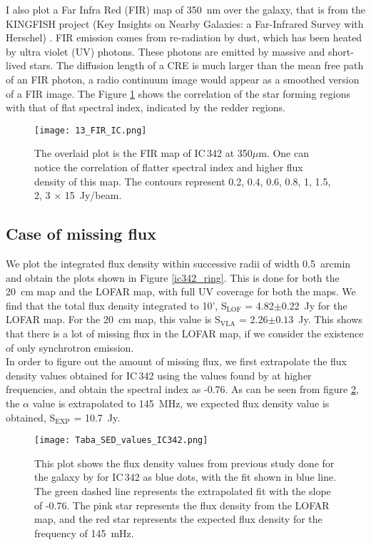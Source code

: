 \documentclass[../main/thesis_msc.tex]{subfiles}
\begin{document}
I also plot a Far Infra Red (FIR) map of 350~nm over the galaxy, that is from the KINGFISH project (Key Insights on Nearby Galaxies: a Far-Infrared Survey with Herschel) \citep{2011PASP..123.1347K}. FIR emission comes from re-radiation by dust, which has been heated by ultra violet (UV) photons. These photons are emitted by massive and short-lived stars. The diffusion length of a CRE is much larger than the mean free path of an FIR photon, a radio continuum image would appear as a smoothed version of a FIR image. The Figure \ref{FIRic} shows the correlation of the star forming regions with that of flat spectral index, indicated by the redder regions.
\begin{figure}
\centering
\texttt{[image: 13\_FIR\_IC.png]}
\caption{The overlaid plot is the FIR map of IC\,342 at 350$\mu$m. One can notice the correlation of flatter spectral index and higher flux density of this map. The contours represent 0.2, 0.4, 0.6, 0.8, 1, 1.5, 2, 3 $\times$ 15~Jy/beam.}
\label{FIRic}
\end{figure}

\subsection{Case of missing flux}
\noindent We plot the integrated flux density within successive radii of width 0.5~arcmin and obtain the plots shown in Figure \ref{ic342_ring}. This is done for both the 20~cm map and the LOFAR map, with full UV coverage for both the maps. We find that the total flux density integrated to 10', S$_{\textrm{LOF}}$ = 4.82$\pm$0.22~Jy for the LOFAR map. For the 20~cm map, this value is S$_{\textrm{VLA}}$ = 2.26$\pm0.13$~Jy. This shows that there is a lot of missing flux in the LOFAR map, if we consider the existence of only synchrotron emission.\\
In order to figure out the amount of missing flux, we first extrapolate the flux density values obtained for IC\,342 using the values found by \citet{2017ApJ...836..185T} at higher frequencies, and obtain the spectral index as -0.76. As can be seen from figure \ref{taba}, the $\alpha$ value is extrapolated to 145~MHz, we expected flux density value is obtained, S$_{\textrm{EXP}}$ = 10.7~Jy. \\


\begin{figure}[h]
\centering
\texttt{[image: Taba\_SED\_values\_IC342.png]}
\caption{This plot shows the flux density values from previous study done for the galaxy by \citet{2017ApJ...836..185T} for IC\,342 as blue dots, with the fit shown in blue line. The green dashed line represents the extrapolated fit with the slope of -0.76. The pink star represents the flux density from the LOFAR map, and the red star represents the expected flux density for the frequency of 145~mHz.}
\label{taba}
\end{figure}
\end{document}
